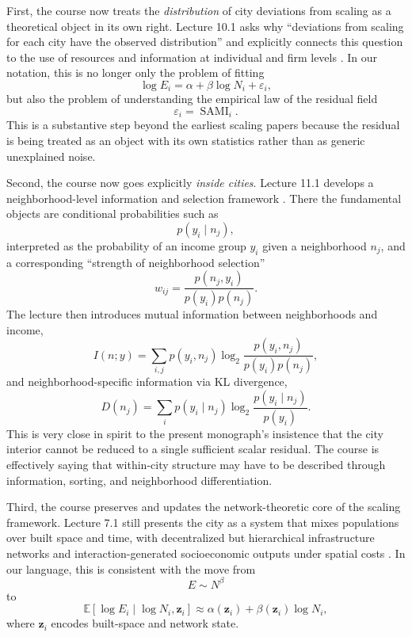 \documentclass[11pt]{article}
\newcommand{\SAMI}{\operatorname{SAMI}}
\newcommand{\E}{\mathbb{E}}
\begin{document}
First, the course now treats the \emph{distribution} of city deviations from scaling as a theoretical object in its own right. Lecture 10.1 asks why ``deviations from scaling for each city have the observed distribution'' and explicitly connects this question to the use of resources and information at individual and firm levels \citep{bettencourtlecture10_2024}. In our notation, this is no longer only the problem of fitting
\begin{equation}
\log E_i = \alpha + \beta \log N_i + \varepsilon_i,
\end{equation}
but also the problem of understanding the empirical law of the residual field
\begin{equation}
\varepsilon_i = \SAMI_i.
\end{equation}
This is a substantive step beyond the earliest scaling papers because the residual is being treated as an object with its own statistics rather than as generic unexplained noise.

Second, the course now goes explicitly \emph{inside cities}. Lecture 11.1 develops a neighborhood-level information and selection framework \citep{bettencourtlecture11_2024}. There the fundamental objects are conditional probabilities such as
\begin{equation}
p(y_i \mid n_j),
\end{equation}
interpreted as the probability of an income group \(y_i\) given a neighborhood \(n_j\), and a corresponding ``strength of neighborhood selection''
\begin{equation}
w_{ij}
=
\frac{p(n_j,y_i)}{p(y_i)p(n_j)}.
\end{equation}
The lecture then introduces mutual information between neighborhoods and income,
\begin{equation}
I(n;y)
=
\sum_{i,j} p(y_i,n_j)\log_2 \frac{p(y_i,n_j)}{p(y_i)p(n_j)},
\end{equation}
and neighborhood-specific information via KL divergence,
\begin{equation}
D(n_j)
=
\sum_i p(y_i\mid n_j)\log_2\frac{p(y_i\mid n_j)}{p(y_i)}.
\end{equation}
This is very close in spirit to the present monograph's insistence that the city interior cannot be reduced to a single sufficient scalar residual. The course is effectively saying that within-city structure may have to be described through information, sorting, and neighborhood differentiation.

Third, the course preserves and updates the network-theoretic core of the scaling framework. Lecture 7.1 still presents the city as a system that mixes populations over built space and time, with decentralized but hierarchical infrastructure networks and interaction-generated socioeconomic outputs under spatial costs \citep{bettencourtlecture7_2024}. In our language, this is consistent with the move from
\begin{equation}
E \sim N^\beta
\end{equation}
to
\begin{equation}
\E[\log E_i\mid \log N_i,\mathbf{z}_i]
\approx
\alpha(\mathbf{z}_i)+\beta(\mathbf{z}_i)\log N_i,
\end{equation}
where \(\mathbf{z}_i\) encodes built-space and network state.
\end{document}
